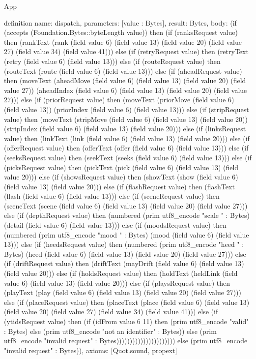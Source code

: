 \begin{lexlean}{App}
\begin{semanticmodule}
definition{
  name: dispatch,
  parameters: [value : Bytes],
  result: Bytes,
  body: (if (accepts (Foundation.Bytes::byteLength value)) then (if (ranksRequest value) then (rankText (rank (field value 6) (field value 13) (field value 20) (field value 27) (field value 34) (field value 41))) else (if (retryRequest value) then (retryText (retry (field value 6) (field value 13))) else (if (routeRequest value) then (routeText (route (field value 6) (field value 13))) else (if (aheadRequest value) then (moveText (aheadMove (field value 6) (field value 13) (field value 20) (field value 27)) (aheadIndex (field value 6) (field value 13) (field value 20) (field value 27))) else (if (priorRequest value) then (moveText (priorMove (field value 6) (field value 13)) (priorIndex (field value 6) (field value 13))) else (if (stripRequest value) then (moveText (stripMove (field value 6) (field value 13) (field value 20)) (stripIndex (field value 6) (field value 13) (field value 20))) else (if (linksRequest value) then (linkText (link (field value 6) (field value 13) (field value 20))) else (if (offerRequest value) then (offerText (offer (field value 6) (field value 13))) else (if (seeksRequest value) then (seekText (seeks (field value 6) (field value 13))) else (if (picksRequest value) then (pickText (pick (field value 6) (field value 13) (field value 20))) else (if (showsRequest value) then (showText (show (field value 6) (field value 13) (field value 20))) else (if (flashRequest value) then (flashText (flash (field value 6) (field value 13))) else (if (sceneRequest value) then (sceneText (scene (field value 6) (field value 13) (field value 20) (field value 27))) else (if (depthRequest value) then (numbered (prim utf8_encode "scale " : Bytes) (detail (field value 6) (field value 13))) else (if (moodsRequest value) then (numbered (prim utf8_encode "mood " : Bytes) (mood (field value 6) (field value 13))) else (if (heedsRequest value) then (numbered (prim utf8_encode "heed " : Bytes) (heed (field value 6) (field value 13) (field value 20) (field value 27))) else (if (driftRequest value) then (driftText (mayDrift (field value 6) (field value 13) (field value 20))) else (if (holdsRequest value) then (holdText (heldLink (field value 6) (field value 13) (field value 20))) else (if (playsRequest value) then (playText (play (field value 6) (field value 13) (field value 20) (field value 27))) else (if (placeRequest value) then (placeText (place (field value 6) (field value 13) (field value 20) (field value 27) (field value 34) (field value 41))) else (if (ytidsRequest value) then (if (idFrom value 6 11) then (prim utf8_encode "valid" : Bytes) else (prim utf8_encode "not an identifier" : Bytes)) else (prim utf8_encode "invalid request" : Bytes)))))))))))))))))))))) else (prim utf8_encode "invalid request" : Bytes)),
  axioms: [Quot.sound, propext]
}


\end{semanticmodule}
\end{lexlean}
